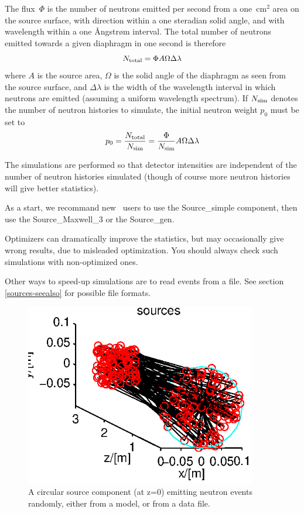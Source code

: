 The flux~$\Phi$ is the number of neutrons emitted per second from a
one~cm$^2$ area on the source surface, with direction within a one
steradian solid angle, and with wavelength within a one {\AA}ngstr{\o}m
interval. The total number of neutrons emitted towards a given diaphragm
in one second is therefore
$$ N_{\rm total} = \Phi A \Omega \Delta\lambda $$
where $A$ is the source area, $\Omega$ is the solid angle of the
diaphragm as seen from the source surface, and $\Delta\lambda$ is the
width of the wavelength interval in which neutrons are emitted (assuming
a uniform wavelength spectrum). If $N_{\rm sim}$ denotes the number of
neutron histories to simulate, the initial neutron weight $p_0$ must be set to
$$ p_0 = \frac{N_{\rm total}}{N_{\rm sim}} =
    \frac{\Phi}{N_{\rm sim}} A \Omega \Delta\lambda $$

The simulations are performed so that detector intensities
are independent of the number of neutron histories simulated
(though of course more neutron histories will give better statistics).

As a start, we recommand new \MCS\ users to use the Source\_simple component, then use the Source\_Maxwell\_3 or the Source\_gen.

Optimizers can dramatically improve the statistics, but may occasionally give wrong results, due to misleaded optimization. You should always check such simulations with non-optimized ones.

Other ways to speed-up simulations are to read events from a file. See section \ref{sources-seealso} for possible file formats.

\begin{figure}
  \begin{center}
    \includegraphics[width=0.9\textwidth]{figures/sources.eps}
  \end{center}
\caption{A circular source component (at z=0) emitting neutron events randomly, either from a model, or from a data file.}
\label{f:source}
\end{figure}

